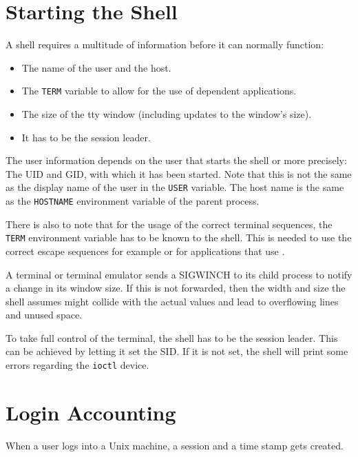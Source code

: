 \documentclass[10pt,a4paper,titlepage,twoside,english,final]{zhawreprt}
\begin{document}
\section{Starting the Shell}\label{sec:DesignStartingTheShell}
A \gls{shell} requires a multitude of information before it can normally function:
\begin{itemize}
\item The name of the user and the host.
\item The \texttt{TERM} variable to allow for the use of \cite{ncurses} dependent applications.
\item The size of the \gls{tty} window (including updates to the window's size).
\item It has to be the session leader.
\end{itemize}

The user information depends on the user that starts the shell or more precisely:
The \gls{UID} and \gls{GID}, with which it has been started.
Note that this is not the same as the display name of the user in the \texttt{USER} variable.
The host name is the same as the \texttt{HOSTNAME} environment variable of the parent process.

There is also to note that for the usage of the correct terminal sequences, the \texttt{TERM} environment variable has to be known to the \gls{shell}.
This is needed to use the correct escape sequences for example or for applications that use \cite{ncurses}.

A terminal or terminal emulator sends a \gls{SIGWINCH} to its child process to notify a change in its window size.
If this is not forwarded, then the width and size the shell assumes might collide with the actual values and lead to overflowing lines and unused space.

To take full control of the terminal, the \gls{shell} has to be the session leader.
This can be achieved by letting it set the \gls{SID}.
If it is not set, the \gls{shell} will print some errors regarding the \texttt{ioctl} device.

\section{Login Accounting}\label{sec:DesignLoginAccounting}
When a user logs into a \gls{Unix} machine, a session and a time stamp gets created.
\end{document}
